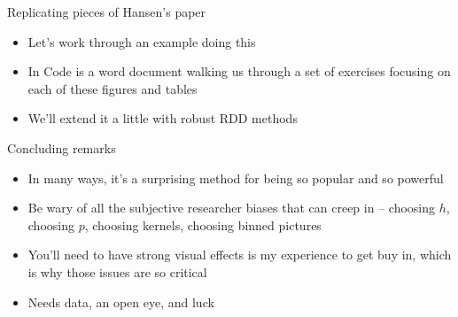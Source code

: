 \documentclass{beamer}
\begin{document}
\begin{frame}{Replicating pieces of Hansen's paper}

\begin{itemize}
\item Let's work through an example doing this
\item In Code is a word document walking us through a set of exercises focusing on each of these figures and tables
\item We'll extend it a little with robust RDD methods
\end{itemize}

\end{frame}


\begin{frame}{Concluding remarks}

\begin{itemize}
\item In many ways, it's a surprising method for being so popular and so powerful
\item Be wary of all the subjective researcher biases that can creep in -- choosing $h$, choosing $p$, choosing kernels, choosing binned pictures
\item You'll need to have strong visual effects is my experience to get buy in, which is why those issues are so critical
\item Needs data, an open eye, and luck
\end{itemize}

\end{frame}
\end{document}
